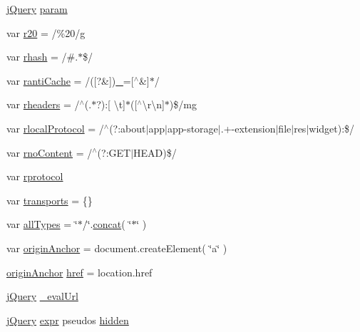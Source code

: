 \begin{DoxyCompactItemize}
\item 
\hyperlink{jquery-3_82_81_8js_a609525712f1102566c2b03866ceb2bba}{j\+Query} \hyperlink{jquery-3_82_81_8js_a24ced9cd3c9e1970a8cbe8d7adedc765}{param}
\item 
var \hyperlink{jquery-3_82_81_8js_a0e39f72d512af99fb5992d66f1a1c821}{r20} = /\%20/g
\item 
var \hyperlink{jquery-3_82_81_8js_a6990b6955b6bec9dd39f3814cfb56d6d}{rhash} = /\#.$\ast$\$/
\item 
var \hyperlink{jquery-3_82_81_8js_a487e87807eb0c70565b0b6789877a6b7}{ranti\+Cache} = /(\mbox{[}?\&\mbox{]})\hyperlink{jquery-3_82_81_8js_a6e69a5af94d7d53886e51f89fb3bd6b4}{\+\_\+}=\mbox{[}$^\wedge$\&\mbox{]}$\ast$/
\item 
var \hyperlink{jquery-3_82_81_8js_af506d11612139f03091db71089d92e8b}{rheaders} = /$^\wedge$(.$\ast$?)\+:\mbox{[} \textbackslash{}t\mbox{]}$\ast$(\mbox{[}$^\wedge$\textbackslash{}r\textbackslash{}n\mbox{]}$\ast$)\$/mg
\item 
var \hyperlink{jquery-3_82_81_8js_af4dd13c90298bbf53ce08ec707dc9e2a}{rlocal\+Protocol} = /$^\wedge$(?\+:about$\vert$app$\vert$app-\/storage$\vert$.+-\/extension$\vert$file$\vert$res$\vert$widget)\+:\$/
\item 
var \hyperlink{jquery-3_82_81_8js_a537d744d72e31ec312aa3f16ef576d3f}{rno\+Content} = /$^\wedge$(?\+:G\+ET$\vert$H\+E\+AD)\$/
\item 
var \hyperlink{jquery-3_82_81_8js_a0f02b710647fcf95e74593954fb9b4cb}{rprotocol}
\item 
var \hyperlink{jquery-3_82_81_8js_ae354ef69102eb621a6b2ef6c9fc4d6a3}{transports} = \{\}
\item 
var \hyperlink{jquery-3_82_81_8js_a2d6199559f6d1e840af674910a329b04}{all\+Types} = \char`\"{}$\ast$/\char`\"{}.\hyperlink{jquery-3_82_81_8js_a15269536d89ee10703f1699529a34bdc}{concat}( \char`\"{}$\ast$\char`\"{} )
\item 
var \hyperlink{jquery-3_82_81_8js_aec9d17c58c3ec6f0dcdc25f05a74378e}{origin\+Anchor} = document.\+create\+Element( \char`\"{}a\char`\"{} )
\item 
\hyperlink{jquery-3_82_81_8js_aec9d17c58c3ec6f0dcdc25f05a74378e}{origin\+Anchor} \hyperlink{jquery-3_82_81_8js_a29e0e1d39cac181b9afc0dcce2ffdcc9}{href} = location.\+href
\item 
\hyperlink{jquery-3_82_81_8js_a609525712f1102566c2b03866ceb2bba}{j\+Query} \hyperlink{jquery-3_82_81_8js_a3df854ea600b5f5f02a872ad0feccfc2}{\+\_\+eval\+Url}
\item 
\hyperlink{jquery-3_82_81_8js_a609525712f1102566c2b03866ceb2bba}{j\+Query} \hyperlink{jquery-3_82_81_8js_aaacd1d5b3593ba4dfff6d67d4f6cfda1}{expr} pseudos \hyperlink{jquery-3_82_81_8js_a1ca5d98f4455c95e2e81c0db83d5b285}{hidden}

\end{DoxyCompactItemize}
